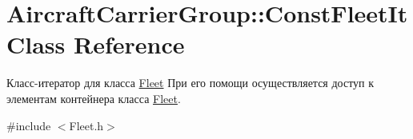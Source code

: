 \hypertarget{class_aircraft_carrier_group_1_1_const_fleet_it}{}\section{Aircraft\+Carrier\+Group\+:\+:Const\+Fleet\+It Class Reference}
\label{class_aircraft_carrier_group_1_1_const_fleet_it}


Класс-\/итератор для класса \mbox{\hyperlink{class_aircraft_carrier_group_1_1_fleet}{Fleet}}  При его помощи осуществляется доступ к элементам контейнера класса \mbox{\hyperlink{class_aircraft_carrier_group_1_1_fleet}{Fleet}}.  




{\ttfamily \#include $<$Fleet.\+h$>$}

